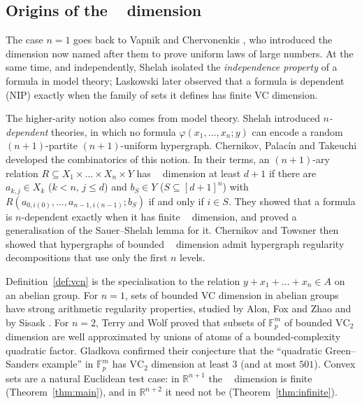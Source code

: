 \documentclass[11pt,a4paper]{article}
\theoremstyle{plain}
\theoremstyle{definition}
\DeclareMathOperator{\VCn}{\mathrm{VC}_n}
\newcommand{\R}{\mathbb{R}}
\begin{document}
\subsection{Origins of the \texorpdfstring{$\VCn$}{VCn} dimension}

The case $n=1$ goes back to Vapnik and Chervonenkis \cite{vc}, who introduced the dimension now
named after them to prove uniform laws of large numbers. At the same time, and independently,
Shelah \cite{shelah71} isolated the \emph{independence property} of a formula in model theory;
Laskowski \cite{laskowski} later observed that a formula is dependent (NIP) exactly when the
family of sets it defines has finite VC dimension.

The higher-arity notion also comes from model theory. Shelah \cite{shelahstrongly,shelah2dep}
introduced \emph{$n$-dependent} theories, in which no formula $\varphi(x_1,\dots,x_n;y)$ can
encode a random $(n+1)$-partite $(n+1)$-uniform hypergraph. Chernikov, Palacín and Takeuchi
\cite{cpt} developed the combinatorics of this notion. In their terms, an $(n+1)$-ary relation
$R\subseteq X_1\times\dots\times X_n\times Y$ has $\VCn$ dimension at least $d+1$ if there
are $a_{k,j}\in X_k$ ($k<n$, $j\le d$) and $b_S\in Y$ ($S\subseteq[d+1]^{n}$) with
$R(a_{0,i(0)},\dots,a_{n-1,i(n-1)};b_S)$ if and only if $i\in S$. They showed that a formula is
$n$-dependent exactly when it has finite $\VCn$ dimension, and proved a generalisation of
the Sauer--Shelah lemma for it. Chernikov and Towsner \cite{chernikovtowsner} then showed that
hypergraphs of bounded $\VCn$ dimension admit hypergraph regularity decompositions that
use only the first $n$ levels.

Definition~\ref{def:vcn} is the specialisation to the relation $y+x_1+\dots+x_n\in A$
on an abelian group. For $n=1$, sets of bounded VC dimension in abelian groups have strong
arithmetic regularity properties, studied by Alon, Fox and Zhao \cite{afz} and by Sisask
\cite{sisask}. For $n=2$, Terry and Wolf \cite{terrywolf,terrywolfvc2} proved that subsets of
$\mathbb{F}_p^{m}$ of bounded $\mathrm{VC}_2$ dimension are well approximated by unions of atoms
of a bounded-complexity quadratic factor. Gladkova \cite{gladkova} confirmed their conjecture that
the ``quadratic Green--Sanders example'' in $\mathbb{F}_p^{m}$ has $\mathrm{VC}_2$ dimension at
least $3$ (and at most $501$). Convex sets are a natural Euclidean test case: in $\R^{n+1}$ the
$\VCn$ dimension is finite (Theorem~\ref{thm:main}), and in $\R^{n+2}$ it need not be
(Theorem~\ref{thm:infinite}).
\end{document}
